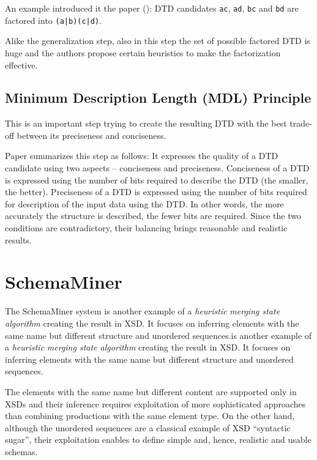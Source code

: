 An example introduced it the paper (\cite{Garofalakis:2000:XSE:342009.335409}): DTD candidates \texttt{ac}, \texttt{ad}, \texttt{bc} and \texttt{bd} are factored into \texttt{(a|b)(c|d)}.

Alike the generalization step, also in this step the set of possible factored DTD is huge and the authors propose certain heuristics to make the factorization effective.

\subsection{Minimum Description Length (MDL) Principle}
This is an important step trying to create the resulting DTD with the best trade-off between its preciseness and conciseness.  

Paper \cite{Mlynkova:2008:AAX:1494650.1495496} summarizes this step as follows: It expresses the quality of a DTD candidate using two aspects – conciseness and preciseness. Conciseness of a DTD is expressed using the number of bits required to describe the DTD (the smaller, the better). Preciseness of a DTD is expressed using the number of bits required for description of the input data using the DTD. In other words, the more accurately the structure is described, the fewer bits are required. Since the two conditions are contradictory, their balancing brings reasonable and realistic results.



\section{SchemaMiner}
The SchemaMiner system  is another example of a \emph{heuristic} \emph{merging state algorithm} creating the result in XSD. It focuses on inferring elements with the same name but different structure and unordered sequences.is another example of a \emph{heuristic} \emph{merging state algorithm} creating the result in XSD. It focuses on inferring elements with the same name but different structure and unordered sequences.

The elements with the same name but different content are supported only in XSDs and their inference requires exploitation of more sophisticated approaches than combining productions with the same element
type. On the other hand, although the unordered sequences are a classical example of XSD “syntactic sugar”, their exploitation enables to define simple and, hence, realistic and usable schemas.

